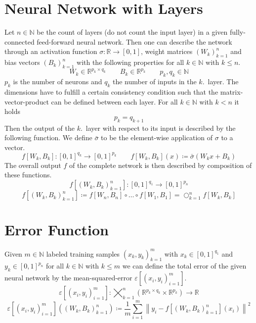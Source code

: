 \documentclass[a4paper,fleqn]{article}
\begin{document}
  \section*{Neural Network with Layers}
    Let $n\in\mathds{N}$ be the count of layers (do not count the input layer) in a given fully-connected feed-forward neural network.
    Then one can describe the network through an activation function $\sigma\colon\mathds{R}\to[0,1]$, weight matrices $(W_k)_{k=1}^n$ and bias vectors $(B_k)_{k=1}^n$ with the following properties for all $k\in\mathds{N}$ with $k\leq n$.
    \[
      W_k \in \mathds{R}^{p_k \times q_k}
      \qquad
      B_k \in \mathds{R}^{p_k}
      \qquad
      p_k,q_k \in \mathds{N}
    \]
    $p_k$ is the number of neurons and $q_k$ the number of inputs in the $k$.~layer.
    The dimensions have to fulfill a certain consistency condition such that the matrix-vector-product can be defined between each layer.
    For all $k\in\mathds{N}$ with $k<n$ it holds
    \[
      p_k = q_{k+1}
    \]
    Then the output of the $k$.~layer with respect to its input is described by the following function.
    We define $\bar{\sigma}$ to be the element-wise application of $\sigma$ to a vector.
    \[
      f\left[W_k,B_k\right]\colon[0,1]^{q_k}\to[0,1]^{p_k}
      \qquad
      f\left[W_k,B_k\right](x) \coloneqq \bar{\sigma}(W_k x + B_k)
    \]
    The overall output $f$ of the complete network is then described by composition of these functions.
    \[
      f\left[(W_k,B_k)_{k=1}^n\right]\colon[0,1]^{q_1}\to[0,1]^{p_n}
    \]
    \[
      f\left[(W_k,B_k)_{k=1}^n\right] \coloneqq f\left[W_n,B_n\right] \circ \ldots \circ f\left[W_1,B_1\right] = \bigcirc_{k=1}^n f\left[W_k,B_k\right]
    \]

  \section*{Error Function}
    Given $m\in\mathds{N}$ labeled training samples $(x_k,y_k)_{k=1}^m$ with $x_k\in[0,1]^{q_1}$ and $y_k\in[0,1]^{p_n}$ for all $k\in\mathds{N}$ with $k\leq m$ we can define the total error of the given neural network by the mean-squared-error $\varepsilon\left[(x_i,y_i)_{i=1}^m\right]$.
    \[
      \varepsilon\left[(x_i,y_i)_{i=1}^m\right]\colon\bigtimes_{k=1}^n \left( \mathds{R}^{p_k\times q_k} \times \mathds{R}^{p_k} \right) \to \mathds{R}
    \]
    \[
      \varepsilon\left[(x_i,y_i)_{i=1}^m\right]\left((W_k,B_k)_{k=1}^n\right) \coloneqq \frac{1}{m}\sum_{i=1}^m \left\| y_i - f\left[(W_k,B_k)_{k=1}^n\right](x_i) \right\|^2
    \]
\end{document}
